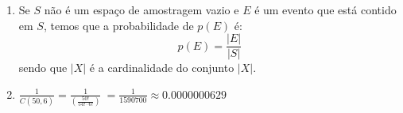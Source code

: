 \item
\begin{enumerate}
  \item
  Se $S$ não é um espaço de amostragem vazio e $E$ é um evento que está contido
  em $S$, temos que a probabilidade de $p(E)$ é:
  $$p(E) = \frac{|E|}{|S|}$$
  sendo que $|X|$ é a cardinalidade do conjunto $|X|$.

  \item
  $\frac{1}{{C(50,6)}} = \frac{1}{{\left( {\frac{{50!}}{{54! \cdot 6!}}} \right)}} \
  = \frac{1}{1590700} \approx 0.0000000629$
\end{enumerate}
